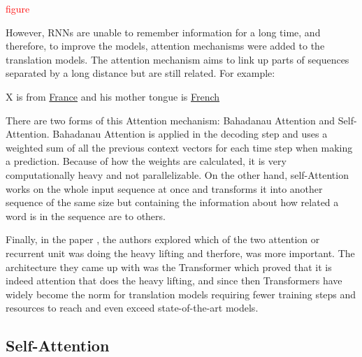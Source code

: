 \documentclass[12pt,a4paper,twoside,openright]{report}
\newcommand{\red}[1]{\textcolor{red}{#1}}
\newcommand{\changedFont}[1]{{\fontfamily{qcr}\selectfont #1}}
\begin{document}
\red{figure}

However, RNNs are unable to remember information for a long time, and therefore, to improve the models, attention mechanisms were added to the translation models. The attention mechanism aims to link up parts of sequences separated by a long distance but are still related. For example:
\begin{center}
    \changedFont{X is from \underline{France} and his mother tongue is \underline{French}}
\end{center}
There are two forms of this Attention mechanism: Bahadanau Attention and Self-Attention. Bahadanau Attention is applied in the decoding step and uses a weighted sum of all the previous context vectors for each time step when making a prediction. Because of how the weights are calculated, it is very computationally heavy and not parallelizable. On the other hand, self-Attention works on the whole input sequence at once and transforms it into another sequence of the same size but containing the information about how related a word is in the sequence are to others.

Finally, in the paper \cite{transformers}, the authors explored which of the two attention or recurrent unit was doing the heavy lifting and therfore, was more important. The architecture they came up with was the Transformer which proved that it is indeed attention that does the heavy lifting, and since then Transformers have widely become the norm for translation models requiring fewer training steps and resources to reach and even exceed state-of-the-art models.


\subsection{Self-Attention}
\label{self-attention}
\end{document}

